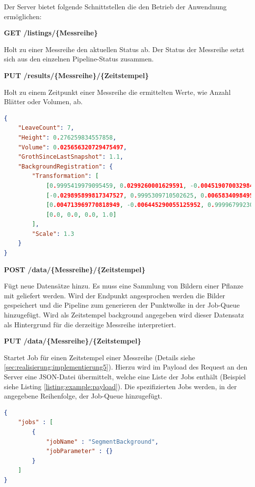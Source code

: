 \documentclass[12pt,titlepage, twoside]{article}
\begin{document}
Der Server bietet folgende Schnittstellen die den Betrieb der Anwendnung ermöglichen:

\textbf{GET /listings/\{Messreihe\}}

Holt zu einer Messreihe den aktuellen Status ab. Der Status der Messreihe setzt sich aus den einzelnen Pipeline-Status zusammen.

\textbf{PUT /results/\{Messreihe\}/\{Zeitstempel\}}

Holt zu einem Zeitpunkt einer Messreihe die ermittelten Werte, wie Anzahl Blätter oder Volumen, ab.

\begin{lstlisting}[language=json, caption={Beispiel Ergebnisse eines Zeitstempels}, captionpos=b, label=listing:example:result]
{
    "LeaveCount": 7,
    "Height": 0.276259834557858,
    "Volume": 0.025656320729475497,
    "GrothSinceLastSnapshot": 1.1,
    "BackgroundRegistration": {
        "Transformation": [
            [0.9995419979095459, 0.0299260001629591, -0.004519070032984018, -0.030479200184345245], 
            [-0.029895899817347527, 0.9995309710502625, 0.0065834098495543, 0.025272000581026077], 
            [0.004713969770818949, -0.006445290055125952, 0.9999679923057556, 0.0013244400033727288], 
            [0.0, 0.0, 0.0, 1.0]
        ],
        "Scale": 1.3
    }
}
\end{lstlisting}

\textbf{POST /data/\{Messreihe\}/\{Zeitstempel\}}

Fügt neue Datensätze hinzu. Es muss eine Sammlung von Bildern einer Pflanze mit geliefert werden. 
Wird der Endpunkt angesprochen werden die Bilder gespeichert und die Pipeline zum generieren der Punktwolke in der Job-Queue hinzugefügt.
Wird als Zeitstempel \glqq background\grqq{} angegeben wird dieser Datensatz als Hintergrund für die derzeitige Messreihe interpretiert.

\textbf{PUT /data/\{Messreihe\}/\{Zeitstempel\}}

Startet Job für einen Zeitstempel einer Messreihe (Details siehe \ref{sec:realisierung:implementierung5}). 
Hierzu wird im Payload des Request an den Server eine JSON-Datei übermittelt, welche eine Liste der Jobs enthält (Beispiel siehe Listing \ref{listing:example:payload}).
Die spezifizierten Jobs werden, in der angegebene Reihenfolge, der Job-Queue hinzugefügt.
\\

\begin{lstlisting}[language=json, caption={Beispiel Payload zum starten einer Pipeline}, captionpos=b, label=listing:example:payload]
{
    "jobs" : [
        {
            "jobName" : "SegmentBackground",
            "jobParameter" : {}
        }
    ]
}
\end{lstlisting}
\end{document}
